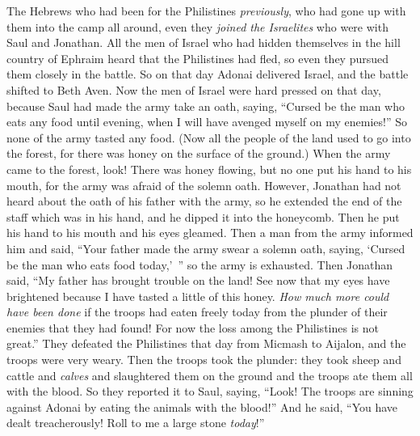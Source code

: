 \begin{biblechapter}
\verse The Hebrews who had been for the Philistines \textit{previously}, who had gone up with them into the camp all around, even they \textit{joined the Israelites} who were with Saul and Jonathan.
\verse All the men of Israel who had hidden themselves in the hill country of Ephraim heard that the Philistines had fled, so even they pursued them closely in the battle.
\verse So on that day Adonai delivered Israel, and the battle shifted to Beth Aven.
 Now the men of Israel were hard pressed on that day, because Saul had made the army take an oath, saying, “Cursed be the man who eats any food until evening, when I will have avenged myself on my enemies!” So none of the army tasted any food.
\verse (Now all the people of the land used to go into the forest, for there was honey on the surface of the ground.)
\verse When the army came to the forest, look! There was honey flowing, but no one put his hand to his mouth, for the army was afraid of the solemn oath.
\verse However, Jonathan had not heard about the oath of his father with the army, so he extended the end of the staff which was in his hand, and he dipped it into the honeycomb. Then he put his hand to his mouth and his eyes gleamed.
\verse Then a man from the army informed him and said, “Your father made the army swear a solemn oath, saying, ‘Cursed be the man who eats food today,’ ” so the army is exhausted.
\verse Then Jonathan said, “My father has brought trouble on the land! See now that my eyes have brightened because I have tasted a little of this honey.
\verse \textit{How much more could have been done} if the troops had eaten freely today from the plunder of their enemies that they had found! For now the loss among the Philistines is not great.”
\verse They defeated the Philistines that day from Micmash to Aijalon, and the troops were very weary.
\verse Then the troops took the plunder: they took sheep and cattle and \textit{calves} and slaughtered them on the ground and the troops ate them all with the blood.
\verse So they reported it to Saul, saying, “Look! The troops are sinning against Adonai by eating the animals with the blood!” And he said, “You have dealt treacherously! Roll to me a large stone \textit{today}!”

\end{biblechapter}
